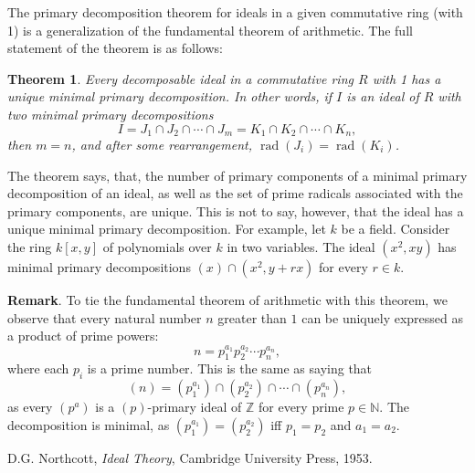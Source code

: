 \documentclass[12pt]{article}
\newtheorem{thm}{Theorem}
\begin{document}
The primary decomposition theorem for ideals in a given commutative ring (with 1) is a generalization of the fundamental theorem of arithmetic.  The full statement of the theorem is as follows:

\begin{thm} Every decomposable ideal in a commutative ring $R$ with 1 has a unique minimal primary decomposition.  In other words, if $I$ is an ideal of $R$ with two minimal primary decompositions
$$I=J_1\cap J_2 \cap \cdots \cap J_m = K_1 \cap K_2 \cap \cdots \cap K_n,$$
then $m=n$, and after some rearrangement, $\operatorname{rad}(J_i)=\operatorname{rad}(K_i)$.
\end{thm}

The theorem says, that, the number of primary components of a minimal primary decomposition of an ideal, as well as the set of prime radicals associated with the primary components, are unique.  This is not to say, however, that the ideal has a unique minimal primary decomposition.  For example, let $k$ be a field.  Consider the ring $k[x,y]$ of polynomials over $k$ in two variables.  The ideal $(x^2,xy)$ has minimal primary decompositions $(x)\cap (x^2,y+rx)$ for every $r\in k$.

\textbf{Remark}.  To tie the fundamental theorem of arithmetic with this theorem, we observe that every natural number $n$ greater than $1$ can be uniquely expressed as a product of prime powers: $$n=p_1^{a_1}p_2^{a_2} \cdots p_n^{a_n},$$ where each $p_i$ is a prime number.  This is the same as saying that $$(n)=(p_1^{a_1}) \cap (p_2^{a_2}) \cap  \cdots \cap (p_n^{a_n}),$$
as every $(p^a)$ is a $(p)$-primary ideal of $\mathbb{Z}$ for every prime $p\in \mathbb{N}$.  The decomposition is minimal, as $(p_1^{a_1})=(p_2^{a_2})$ iff $p_1=p_2$ and $a_1=a_2$.

\begin{thebibliography}{9}
D.G. Northcott, \emph{Ideal Theory}, Cambridge University Press, 1953.
\end{thebibliography}
\end{document}

